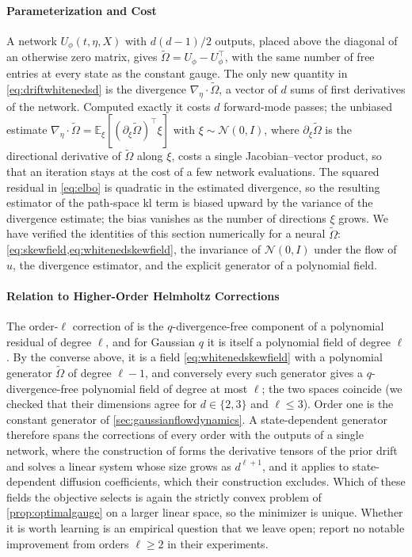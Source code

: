 \documentclass{article} %
\newcommand{\obs}{X}
\newcommand{\gauge}{\Omega}
\newcommand{\E}{\mathbb{E}}
\newcommand{\Norm}{\mathcal{N}}
\begin{document}
\paragraph{Parameterization and Cost}
A network $U_\phi(t, \eta, \obs)$ with $d(d-1)/2$ outputs, placed above the diagonal of an otherwise zero matrix, gives $\tilde\gauge = U_\phi - U_\phi^\top$, with the same number of free entries at every state as the constant gauge. The only new quantity in \cref{eq:driftwhitenedsd} is the divergence $\nabla_\eta \cdot \tilde\gauge$, a vector of $d$ sums of first derivatives of the network. Computed exactly it costs $d$ forward-mode passes; the unbiased estimate $\nabla_\eta \cdot \tilde\gauge = \E_\xi[(\partial_\xi \tilde\gauge)^\top \xi]$ with $\xi \sim \Norm(0, I)$, where $\partial_\xi \tilde\gauge$ is the directional derivative of $\tilde\gauge$ along $\xi$, costs a single Jacobian--vector product, so that an iteration stays at the cost of a few network evaluations. The squared residual in \cref{eq:elbo} is quadratic in the estimated divergence, so the resulting estimator of the path-space \gls{kl} term is biased upward by the variance of the divergence estimate; the bias vanishes as the number of directions $\xi$ grows. We have verified the identities of this section numerically for a neural $\tilde\gauge$: \cref{eq:skewfield,eq:whitenedskewfield}, the invariance of $\Norm(0, I)$ under the flow of $u$, the divergence estimator, and the explicit generator of a polynomial field.

\paragraph{Relation to Higher-Order Helmholtz Corrections}
The order-$\ell$ correction of \citet{smith2026closing} is the $q$-divergence-free component of a polynomial residual of degree $\ell$, and for Gaussian $q$ it is itself a polynomial field of degree $\ell$. By the converse above, it is a field \cref{eq:whitenedskewfield} with a polynomial generator $\tilde\gauge$ of degree $\ell - 1$, and conversely every such generator gives a $q$-divergence-free polynomial field of degree at most $\ell$; the two spaces coincide (we checked that their dimensions agree for $d \in \{2, 3\}$ and $\ell \le 3$). Order one is the constant generator of \cref{sec:gaussianflowdynamics}. A state-dependent generator therefore spans the corrections of every order with the outputs of a single network, where the construction of \citet{smith2026closing} forms the derivative tensors of the prior drift and solves a linear system whose size grows as $d^{\ell + 1}$, and it applies to state-dependent diffusion coefficients, which their construction excludes. Which of these fields the objective selects is again the strictly convex problem of \cref{prop:optimalgauge} on a larger linear space, so the minimizer is unique. Whether it is worth learning is an empirical question that we leave open; \citet{smith2026closing} report no notable improvement from orders $\ell \ge 2$ in their experiments.
\end{document}
